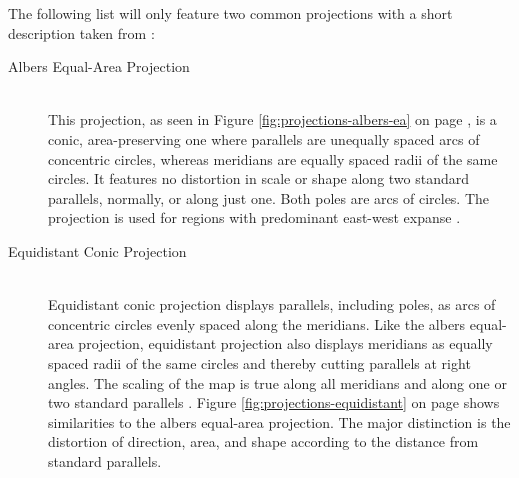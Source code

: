 The following list will only feature two common projections with a short description taken from \citeauthor{Snyder1987} :

\begin{description}
\item[Albers Equal-Area Projection] \hfill \\
\label{s:albers-equal-area-projection}
This projection, as seen in Figure \ref{fig:projections-albers-ea} on page \pageref{fig:projections-albers-ea}, is a conic, area-preserving one where parallels are unequally spaced arcs of concentric circles, whereas meridians are equally spaced radii of the same circles. It features no distortion in scale or shape along two standard parallels, normally, or along just one. Both poles are arcs of circles. The projection is used for regions with predominant east-west expanse .

\item[Equidistant Conic Projection] \hfill \\
Equidistant conic projection displays parallels, including poles, as arcs of concentric circles evenly spaced along the meridians. Like the albers equal-area projection, equidistant projection also displays meridians as equally spaced radii of the same circles and thereby cutting parallels at right angles. The scaling of the map is true along all meridians and along one or two standard parallels . Figure \ref{fig:projections-equidistant} on page \pageref{fig:projections-equidistant} shows similarities to the albers equal-area projection. The major distinction is the distortion of direction, area, and shape according to the distance from standard parallels.
\end{description}

